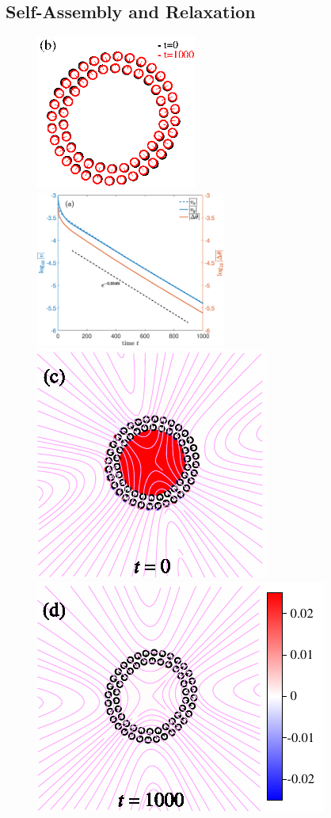 \documentclass[lineno]{jfm}
\begin{document}
\subsection{Self-Assembly and Relaxation}
\begin{figure}
\centering
\includegraphics[height=2in]{relax2.eps}
\includegraphics[height=2in]{relax.eps}\\
\includegraphics[height=2.in]{N58_0pres.pdf}
\includegraphics[height=2.in]{N58_5000pres.pdf}

\end{figure}
\end{document}
